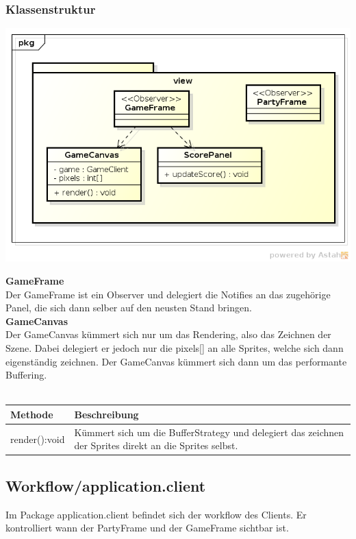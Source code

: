\documentclass[11pt]{scrartcl}
\begin{document}
\subsubsection{Klassenstruktur}
\includegraphics[scale=0.8]{ClassDiagramView}


\textbf{GameFrame}\\
Der GameFrame ist ein Observer und delegiert die Notifies an das zugehörige Panel, die sich dann selber auf den neusten Stand bringen.\\

\textbf{GameCanvas}\\
Der GameCanvas kümmert sich nur um das Rendering, also das Zeichnen der Szene. Dabei delegiert er jedoch nur die pixels[] an alle Sprites, welche sich dann eigenständig zeichnen. Der GameCanvas kümmert sich dann um das performante Buffering.\\\\
\begin{tabularx}{\linewidth}{l p{12cm}}
\textbf{Methode} & \textbf{Beschreibung}\\
\hline
render():void & Kümmert sich um die BufferStrategy und delegiert das zeichnen der Sprites direkt an die Sprites selbst.
\end{tabularx}

\newpage

\subsection{Workflow/application.client}
Im Package application.client befindet sich der workflow des Clients. Er kontrolliert wann der PartyFrame und der GameFrame sichtbar ist.
\end{document}
